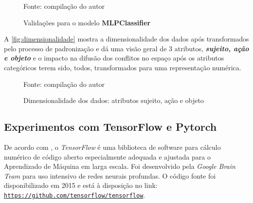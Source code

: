 \begin{figure}[h!]
	\centering
	\caption{Validações para o modelo \textbf{MLPClassifier}}
	
	\label{fig:validacao_notebook}
	{\scriptsize Fonte: compilação do autor}
\end{figure}

A \autoref{fig:dimensionalidade} mostra a dimensionalidade dos dados após transformados pelo processo de padronização e dá uma visão geral de 3 atributos, \textit{\textbf{sujeito, ação e objeto}} e o impacto na difusão dos conflitos no espaço após os atributos categóricos terem sido, todos, transformados para uma representação numérica.

\begin{figure}[h!]
	\centering
	\caption{Dimensionalidade dos dados: atributos sujeito, ação e objeto}
	
	\label{fig:dimensionalidade}
	{\scriptsize Fonte: compilação do autor}
\end{figure}

\subsection{Experimentos com TensorFlow e Pytorch}\label{exp:tensorflow-pytorch}
De acordo com , o \textit{TensorFlow} é uma biblioteca de software para cálculo numérico de código aberto especialmente adequada e ajustada para o Aprendizado de Máquina em larga escala. Foi desenvolvido pela \textit{Google Brain Team} para uso intensivo de redes neurais profundas. O código fonte foi disponibilizado em 2015 e está à disposição no link: \underline{\texttt{https://github.com/tensorflow/tensorflow}}.

